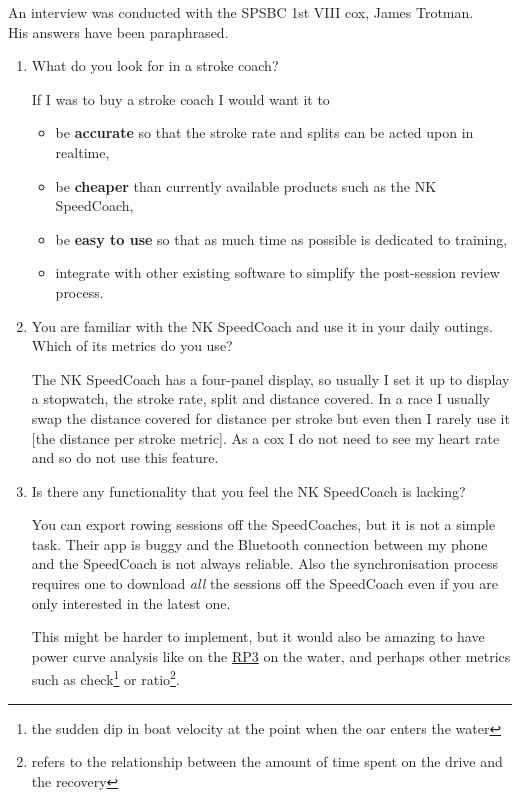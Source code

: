\documentclass[11pt,twoside,a4paper]{report}
\begin{document}
An interview was conducted with the SPSBC 1st VIII cox, James Trotman. \\ His answers have been paraphrased.
\begin{enumerate}
  \item What do you look for in a stroke coach?
  
  If I was to buy a stroke coach I would want it to
  \begin{itemize}
    \item be \textbf{accurate} so that the stroke rate and splits can be acted upon in realtime,
    \item be \textbf{cheaper} than currently available products such as the NK SpeedCoach,
    \item be \textbf{easy to use} so that as much time as possible is dedicated to training,
    \item integrate with other existing software to simplify the post-session review process.
  \end{itemize}

  \item You are familiar with the NK SpeedCoach and use it in your daily outings. \\ Which of its metrics do you use?
  
  The NK SpeedCoach has a four-panel display, so usually I set it up to display a stopwatch, the stroke rate, split and distance covered. In a race I usually swap the distance covered for distance per stroke but even then I rarely use it [the distance per stroke metric]. As a cox I do not need to see my heart rate and so do not use this feature.
  
  \item Is there any functionality that you feel the NK SpeedCoach is lacking?
  
  You can export rowing sessions off the SpeedCoaches, but it is not a simple task. Their app is buggy and the Bluetooth connection between my phone and the SpeedCoach is not always reliable. Also the synchronisation process requires one to download \textit{all} the sessions off the SpeedCoach even if you are only interested in the latest one.

  This might be harder to implement, but it would also be amazing to have power curve analysis like on the \href{https://www.rp3rowing.co.uk/}{RP3} on the water, and perhaps other metrics such as check\footnote{the sudden dip in boat velocity at the point when the oar enters the water} or ratio\footnote{refers to the relationship between the amount of time spent on the drive and the recovery}.


\end{enumerate}
\end{document}
